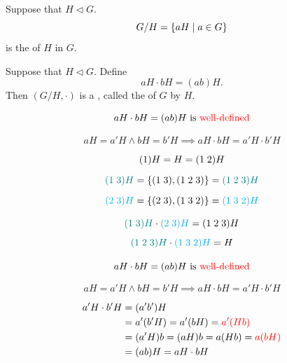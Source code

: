 \begin{frame}
  \begin{definition}[正规子群的陪集]
    Suppose that $H \triangleleft G$.
    \[
      G/H = \{aH \mid a \in G\}
    \]
    is the  of $H$ in $G$.
  \end{definition}
\end{frame}

\begin{frame}
  \begin{definition}
    Suppose that $H \triangleleft G$.
    Define
    \[
      aH \cdot bH = (ab)H.
    \]
    Then $(G/H, \cdot)$ is a ,
    called the  of $G$ by $H$.
  \end{definition}
\end{frame}

\begin{frame}
  \[
    aH \cdot bH = (ab)H \text{ is \textcolor{red}{well-defined}}
  \]

  \pause
  \begin{center}
  \end{center}

  \pause
  \[
    aH = a'H \land bH = b'H \implies aH \cdot bH = a'H \cdot b'H
  \]

  \pause
  \begin{gather*}
    (1) H = H = (1\; 2) H \\[6pt]
    \textcolor{teal}{(1\; 3) H} = \{(1\; 3), (1\; 2\; 3)\} = \textcolor{teal}{(1\; 2\; 3)H} \\[6pt]
    \textcolor{cyan}{(2\; 3) H} = \{(2\; 3), (1\; 3\; 2)\} = \textcolor{cyan}{(1\; 3\; 2)H}
  \end{gather*}

  \pause
  \[
    \textcolor{teal}{(1\; 3) H} \cdot \textcolor{cyan}{(2\; 3) H} = (1\; 2\; 3)H
  \]
  \[
    \textcolor{teal}{(1\; 2\; 3) H} \cdot \textcolor{cyan}{(1\; 3\; 2) H} = H
  \]
\end{frame}

\begin{frame}
  \[
    aH \cdot bH = (ab)H \text{ is \textcolor{red}{well-defined}}
  \]

  \begin{center}
  \end{center}

  \[
    aH = a'H \land bH = b'H \implies aH \cdot bH = a'H \cdot b'H
  \]

  \pause
  \begin{align*}
    a'H \cdot b'H &= (a'b')H \\
      &= a'(b'H) = a'(b H) = \textcolor{red}{a' (Hb)} \\
      &= (a'H)b = (aH)b = a(Hb) = \textcolor{red}{a(bH)} \\
      &= (ab)H = aH \cdot bH
  \end{align*}
\end{frame}

